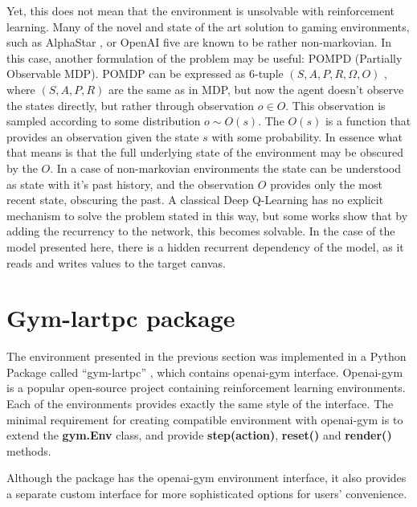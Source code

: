 Yet, this does not mean that the environment is unsolvable with reinforcement learning.
Many of the novel and state of the art solution to gaming environments, such as AlphaStar \cite{Vinyals2019}, or OpenAI five \cite{doi.org/10.48550/arxiv.1912.06680} are known to be rather non-markovian.
In this case, another formulation of the problem may be useful: POMPD (Partially Observable MDP).
POMDP can be expressed as 6-tuple $(S,A,P,R,\Omega,O)$ , where $(S,A,P,R)$ are the same as in MDP, but now the agent doesn't observe the states directly, but rather through observation $o \in O$.
This observation is sampled according to some distribution $o \sim O(s)$. The $O(s)$ is a function that provides an observation given the state $s$ with some probability.
In essence what that means is that the full underlying state of the environment may be obscured by the $O$. In a case of non-markovian environments the state can be understood as state with it's past history, and the observation $O$ provides only the most recent state, obscuring the past.
A classical Deep Q-Learning has no explicit mechanism to solve the problem stated in this way, but some works \cite{doi.org/10.48550/arxiv.1507.06527} show that by adding the recurrency to the network, this becomes solvable.
In the case of the model presented here, there is a hidden recurrent dependency of the model, as it reads and writes values to the target canvas.

\section{Gym-lartpc package}
The environment presented in the previous section was implemented in a Python Package called ``gym-lartpc'' \cite{gymlartpc}, which contains openai-gym interface.
Openai-gym \cite{openaigym}is a popular open-source project containing reinforcement learning environments.
Each of the environments provides exactly the same style of the interface.
The minimal requirement for creating compatible environment with openai-gym is to extend the \textbf{gym.Env} class, and provide \textbf{step(action)}, \textbf{reset()} and \textbf{render()} methods.


Although the package has the openai-gym environment interface, it also provides a separate custom interface for more sophisticated options for users' convenience.

